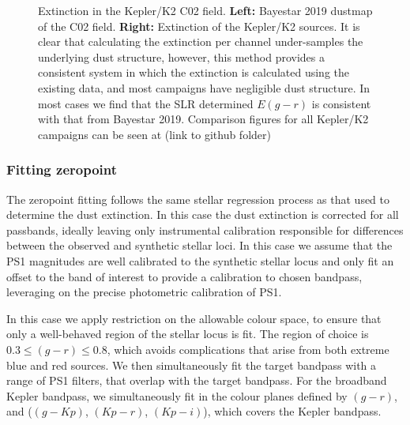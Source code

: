 \documentclass{aastex63}
\begin{document}
\begin{figure}
\caption{Extinction in the Kepler/K2 C02 field. \textbf{Left:} Bayestar 2019 dustmap of the C02 field. \textbf{Right:} Extinction of the Kepler/K2 sources. It is clear that calculating the extinction per channel under-samples the underlying dust structure, however, this method provides a consistent system in which the extinction is calculated using the existing data, and most campaigns have negligible dust structure. In most cases we find that the SLR determined $E(g-r)$ is consistent with that from Bayestar 2019. Comparison figures for all Kepler/K2 campaigns can be seen at (link to github folder) \label{fig:ext_dist}}
\end{figure}


\subsubsection{Fitting zeropoint}

The zeropoint fitting follows the same stellar regression process as that used to determine the dust extinction. In this case the dust extinction is corrected for all passbands, ideally leaving only instrumental calibration responsible for differences between the observed and synthetic stellar loci. In this case we assume that the PS1 magnitudes are well calibrated to the synthetic stellar locus and only fit an offset to the band of interest to provide a calibration to chosen bandpass, leveraging on the precise photometric calibration of PS1. 


In this case we apply restriction on the allowable colour space, to ensure that only a well-behaved region of the stellar locus is fit. The region of choice is $0.3 \leq (g-r)\leq 0.8$, which avoids complications that arise from both extreme blue and red sources. We then simultaneously fit the target bandpass with a range of PS1 filters, that overlap with the target bandpass. For the broadband Kepler bandpass, we simultaneously fit in the colour planes defined by $(g-r)$, and ($(g-Kp)$, $(Kp-r)$, $(Kp-i)$), which covers the Kepler bandpass. 
\end{document}
